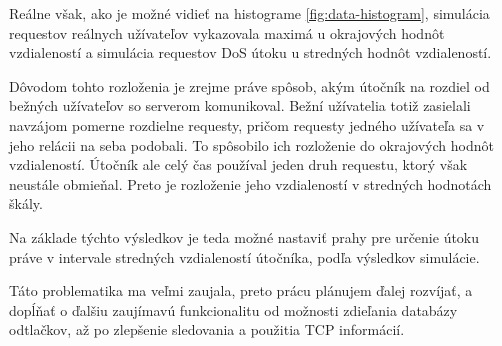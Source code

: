 \documentclass[
  digital, %
  table,   %
  lof,     %
  nolot,   %
  nocover
]{fithesis3}
\begin{document}
Reálne však, ako je možné vidieť na histograme \ref{fig:data-histogram},
simulácia requestov reálnych užívateľov vykazovala maximá u okrajových hodnôt
vzdialeností a simulácia requestov DoS útoku u stredných hodnôt vzdialeností. 

Dôvodom tohto rozloženia je zrejme práve spôsob, akým útočník na rozdiel od
bežných užívateľov so serverom komunikoval. Bežní užívatelia totiž zasielali
navzájom pomerne rozdielne requesty, pričom requesty jedného užívateľa sa v jeho
relácii na seba podobali. To spôsobilo ich rozloženie do okrajových hodnôt
vzdialeností. Útočník ale celý čas používal jeden druh requestu, ktorý však
neustále obmieňal. Preto je rozloženie jeho vzdialeností v stredných hodnotách
škály. 

Na základe týchto výsledkov je teda možné nastaviť prahy pre určenie útoku
práve v intervale stredných vzdialeností útočníka, podľa výsledkov simulácie.

Táto problematika ma veľmi zaujala, preto prácu plánujem ďalej rozvíjať,
a dopĺňať o ďalšiu zaujímavú funkcionalitu od možnosti zdieľania
databázy odtlačkov, až po zlepšenie sledovania a použitia TCP informácií.

\printbibliography
{} 

\makeatletter\thesis@blocks@clear\makeatother
{} %
\printindex

\appendix %
\end{document}
